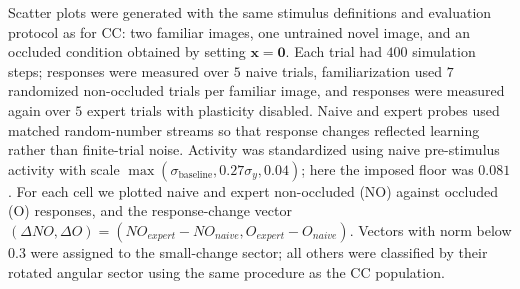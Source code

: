 Scatter plots were generated with the same stimulus definitions and evaluation
protocol as for CC: two familiar images, one untrained novel image, and an
occluded condition obtained by setting $\mathbf{x}=\mathbf{0}$. Each trial had
$400$ simulation steps; responses were measured over $5$ naive trials,
familiarization used $7$ randomized non-occluded trials per familiar image, and
responses were measured again over $5$ expert trials with plasticity disabled.
Naive and expert probes used matched random-number streams so that response
changes reflected learning rather than finite-trial noise. Activity was
standardized using naive pre-stimulus activity with scale
$\max(\sigma_{\mathrm{baseline}},0.27\sigma_y,0.04)$; here the imposed floor was
$0.081$. For each cell we plotted naive and expert non-occluded (NO) against
occluded (O) responses, and the response-change vector
$(\Delta NO,\Delta O)=(NO_{expert}-NO_{naive},O_{expert}-O_{naive})$.
Vectors with norm below $0.3$ were assigned to the small-change sector; all
others were classified by their rotated angular sector using the same procedure
as the CC population.
